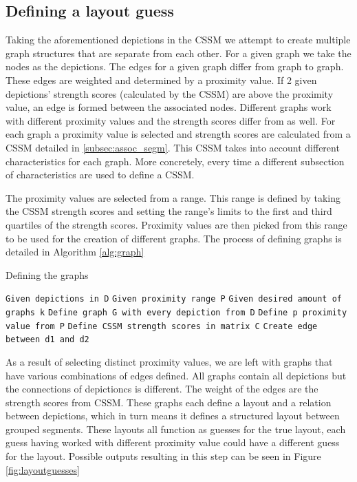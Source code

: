 \subsection{Defining a layout guess} %

Taking the aforementioned depictions in the CSSM we attempt to create multiple graph structures that are separate from each other. For a given graph we take the nodes as the depictions. The edges for a given graph differ from graph to graph. These edges are weighted and  determined by a proximity value. If 2 given depictions' strength scores (calculated by the CSSM) are above the proximity value, an edge is formed between the associated nodes. Different graphs work with different proximity values and the strength scores differ from as well. For each graph a proximity value is selected and strength scores are calculated from a CSSM detailed in \ref{subsec:assoc_segm}. This CSSM takes into account different characteristics for each graph. More concretely, every time a different subsection of characteristics are used to define a CSSM. 

The proximity values are selected from a range. This range is defined by taking the CSSM strength scores and setting the range's limits to the first and third quartiles of the strength scores. Proximity values are then picked from this range to be used for the creation of different graphs. The process of defining graphs is detailed in Algorithm \ref{alg:graph}

\begin{algorithm}
\caption{Defining the graphs}\label{alg:graph}
\begin{algorithmic}
\State \texttt{Given depictions in D}
\State \texttt{Given proximity range P}
\State \texttt{Given desired amount of graphs k}
\State \texttt{Define graph G with every depiction from D}
    \State \texttt{Define p proximity value from P}
    \State \texttt{Define CSSM strength scores in matrix C}
                \State \texttt{Create edge between d1 and d2}
            \EndIf
        \EndFor
    \EndFor
\EndFor

\end{algorithmic}
\end{algorithm}


\newpage
As a result of selecting distinct proximity values, we are left with graphs that have various combinations of edges defined. All graphs contain all depictions but the connections of depictioncs is different. The weight of the edges are the strength scores from CSSM. These graphs each define a layout and a relation between depictions, which in turn means it defines a structured layout between grouped segments. These layouts all function as guesses for the true layout, each guess having worked with different proximity value could have a different guess for the layout. Possible outputs resulting in this step can be seen in Figure \ref{fig:layoutguesses}

